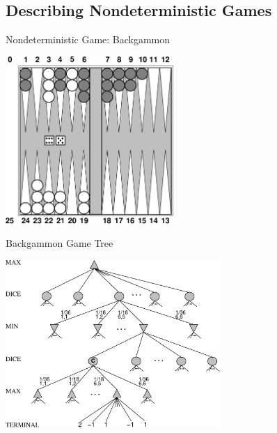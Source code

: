 \documentclass[14pt]{beamer}
\begin{document}
\subsection{Describing Nondeterministic Games}
\begin{frame}{Nondeterministic Game: Backgammon}
	\begin{center}
		\includegraphics[height=2.5in]{backgammon-position.pdf}
	\end{center}
\end{frame}
\begin{frame}{Backgammon Game Tree}
	\begin{center}
		\includegraphics[height=2.5in]{backgammon-tree.pdf}
	\end{center}
\end{frame}
\end{document}
